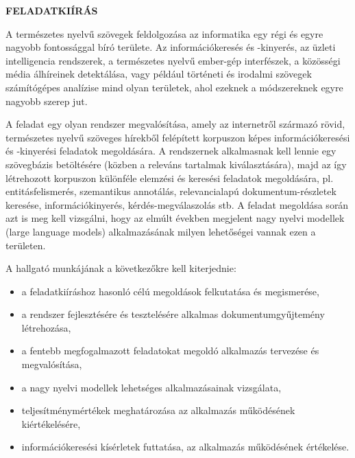 \clearpage
\begin{center}
\large
\textbf{FELADATKIÍRÁS}\\
\end{center}

A természetes nyelvű szövegek feldolgozása az informatika egy régi és egyre nagyobb fontossággal bíró területe. Az információkeresés és -kinyerés, az üzleti intelligencia rendszerek, a természetes nyelvű ember-gép interfészek, a közösségi média álhíreinek detektálása, vagy például történeti és irodalmi szövegek számítógépes analízise mind olyan területek, ahol ezeknek a módszereknek egyre nagyobb szerep jut.

A feladat egy olyan rendszer megvalósítása, amely az internetről származó rövid, természetes nyelvű szöveges hírekből felépített korpuszon képes információkeresési és -kinyerési feladatok megoldására. A rendszernek alkalmasnak kell lennie egy szövegbázis betöltésére (közben a releváns tartalmak kiválasztására), majd az így létrehozott korpuszon különféle elemzési és keresési feladatok megoldására, pl. entitásfelismerés, szemantikus annotálás, relevancialapú dokumentum-részletek keresése, információkinyerés, kérdés-megválaszolás stb. A feladat megoldása során azt is meg kell vizsgálni, hogy az elmúlt években megjelent nagy nyelvi modellek (large language models) alkalmazásának milyen lehetőségei vannak ezen a területen.

A hallgató munkájának a következőkre kell kiterjednie:
\begin{itemize}
	\item a feladatkiíráshoz hasonló célú megoldások felkutatása és megismerése,
	\item a rendszer fejlesztésére és tesztelésére alkalmas dokumentumgyűjtemény létrehozása,
	\item a fentebb megfogalmazott feladatokat megoldó alkalmazás tervezése és megvalósítása,
	\item a nagy nyelvi modellek lehetséges alkalmazásainak vizsgálata,
	\item teljesítménymértékek meghatározása az alkalmazás működésének kiértékelésére,
	\item információkeresési kísérletek futtatása, az alkalmazás működésének értékelése.
\end{itemize}




